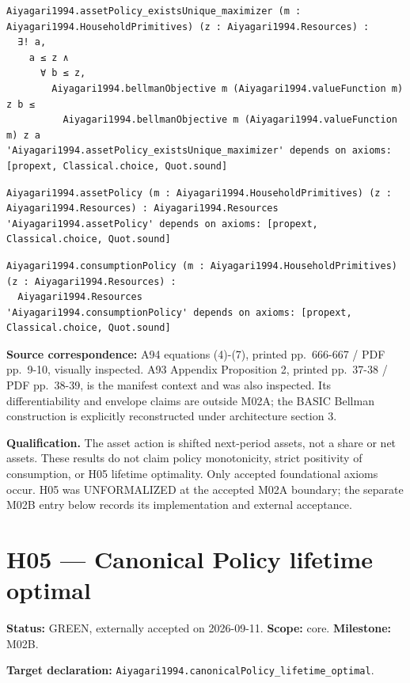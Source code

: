 \documentclass[
  11pt,
]{article}
\let\LedgerOriginalTexttt\texttt
\renewcommand{\texttt}[1]{{\small\LedgerOriginalTexttt{#1}}}
\begin{document}
\begin{verbatim}
Aiyagari1994.assetPolicy_existsUnique_maximizer (m : Aiyagari1994.HouseholdPrimitives) (z : Aiyagari1994.Resources) :
  ∃! a,
    a ≤ z ∧
      ∀ b ≤ z,
        Aiyagari1994.bellmanObjective m (Aiyagari1994.valueFunction m) z b ≤
          Aiyagari1994.bellmanObjective m (Aiyagari1994.valueFunction m) z a
'Aiyagari1994.assetPolicy_existsUnique_maximizer' depends on axioms: [propext, Classical.choice, Quot.sound]
\end{verbatim}

\begin{verbatim}
Aiyagari1994.assetPolicy (m : Aiyagari1994.HouseholdPrimitives) (z : Aiyagari1994.Resources) : Aiyagari1994.Resources
'Aiyagari1994.assetPolicy' depends on axioms: [propext, Classical.choice, Quot.sound]
\end{verbatim}

\begin{verbatim}
Aiyagari1994.consumptionPolicy (m : Aiyagari1994.HouseholdPrimitives) (z : Aiyagari1994.Resources) :
  Aiyagari1994.Resources
'Aiyagari1994.consumptionPolicy' depends on axioms: [propext, Classical.choice, Quot.sound]
\end{verbatim}

\textbf{Source correspondence:} A94 equations (4)-(7), printed
pp.~666-667 / PDF pp.~9-10, visually inspected. A93 Appendix Proposition
2, printed pp.~37-38 / PDF pp.~38-39, is the manifest context and was
also inspected. Its differentiability and envelope claims are outside
M02A; the BASIC Bellman construction is explicitly reconstructed under
architecture section 3.

\textbf{Qualification.} The asset action is shifted next-period assets,
not a share or net assets. These results do not claim policy
monotonicity, strict positivity of consumption, or H05 lifetime
optimality. Only accepted foundational axioms occur. H05 was
UNFORMALIZED at the accepted M02A boundary; the separate M02B entry
below records its implementation and external acceptance.

\section{H05 --- Canonical Policy lifetime
optimal}\label{h05-canonical-policy-lifetime-optimal}

\textbf{Status:} GREEN, externally accepted on 2026-09-11.
\textbf{Scope:} core. \textbf{Milestone:} M02B.

\textbf{Target declaration:}
\texttt{Aiyagari1994.canonicalPolicy\_lifetime\_optimal}.
\end{document}
